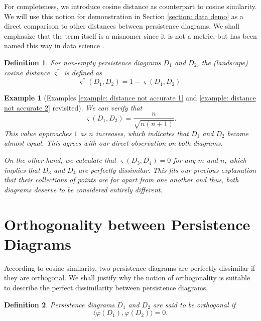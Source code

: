 \documentclass[sn-mathphys-num]{sn-jnl}%
\theoremstyle{thmstyleone}%
\theoremstyle{thmstyletwo}%
\newtheorem{example}{Example}%
\theoremstyle{thmstylethree}%
\newtheorem{definition}{Definition}%
\begin{document}
For completeness, we introduce cosine distance as counterpart to cosine similarity. We will use this notion for demonstration in Section \ref{section: data demo} as a direct comparison to other distances between persistence diagrams. We shall emphasize that the term itself is a misnomer since it is not a metric, but has been named this way in data science \cite{Tan}.

\begin{definition}
	For non-empty persistence diagrams $D_1$ and $D_2$, the \emph{(landscape) cosine distance} $\varsigma^*$ is defined as
	\begin{equation*}
		\varsigma^*(D_1,D_2) = 1 - \varsigma(D_1,D_2).
	\end{equation*}
\end{definition}

\begin{example}[Examples \ref{example: distance not accurate 1} and \ref{example: distance not accurate 2} revisited]
	We can verify that
	\begin{equation*}
		\varsigma(D_1, D_2)=\frac{n}{\sqrt{n(n+1)}}.
	\end{equation*}
	This value approaches $1$ as $n$ increases, which indicates that $D_1$ and $D_2$ become almost equal. This agrees with our direct observation on both diagrams.
	
	On the other hand, we calculate that $\varsigma(D_3,D_4)=0$ for any $m$ and $n$, which implies that $D_3$ and $D_4$ are perfectly dissimilar. This fits our previous explanation that their collections of points are far apart from one another and thus, both diagrams deserve to be considered entirely different.
\end{example}

\section{Orthogonality between Persistence Diagrams}\label{section: orthogonality}
According to cosine similarity, two persistence diagrams are perfectly dissimilar if they are orthogonal. We shall justify why the notion of orthogonality is suitable to describe the perfect dissimilarity between persistence diagrams.

\begin{definition}
	Persistence diagrams $D_1$ and $D_2$ are said to be \emph{orthogonal} if
	\begin{equation*}
		\langle \varphi(D_1), \varphi(D_2) \rangle = 0.
	\end{equation*}
\end{definition}
\end{document}
